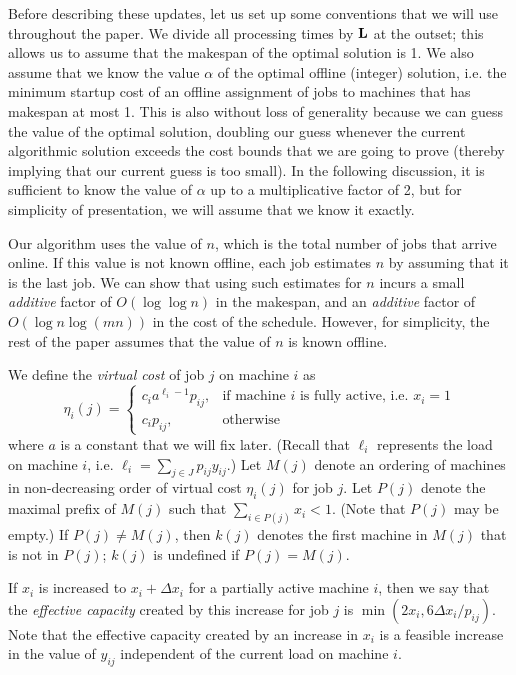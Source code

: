 \documentclass[11pt]{article}
\begin{document}
Before describing these updates, let us set up some 
conventions that we will use throughout the paper.
We divide all processing times by $\bf L$ at the outset;
this allows us to assume that the makespan of the optimal solution is 1.
We also assume that we know the value $\alpha$ of the optimal 
offline (integer) solution, i.e. the minimum startup cost of an offline 
assignment of jobs to machines that has makespan at most 1. 
This is also without loss of generality because we can guess the 
value of the optimal solution, doubling our guess whenever the 
current algorithmic solution exceeds the cost bounds that we are 
going to prove (thereby implying that our current guess is too small). 
In the following discussion, it is sufficient to
know the value of $\alpha$ up to a multiplicative 
factor of 2, but for simplicity
of presentation, we will assume that we know it exactly.

Our algorithm uses the value of $n$, which is the total number of
jobs that arrive online. If this value is not known offline, each job 
estimates $n$ by assuming that it is the last job. We can show that 
using such estimates for $n$ incurs a small {\em additive} factor of 
$O(\log \log n)$ in the makespan, and an {\em additive} factor of 
$O(\log n\log (mn))$ in the cost of the schedule. 
However, for simplicity, the rest of the paper assumes that the value 
of $n$ is known offline.

We define the {\em virtual cost} of job $j$ on machine $i$ as 
\begin{equation*}
\eta_i(j) = \left\{ \begin{array}{ll}
c_i a^{\ell_i-1} p_{ij}, & \text{if machine $i$ is fully active, i.e. } x_i = 1 \\
c_i p_{ij}, & \text{otherwise}
\end{array}\right.
\end{equation*}
where $a$ is a constant that we will fix later. 
(Recall that $\ell_i$ represents the load on machine $i$, 
i.e. $\ell_i = \sum_{j\in J} p_{ij} y_{ij}$.)
Let $M(j)$ denote
an ordering of machines in non-decreasing order of virtual cost 
$\eta_i(j)$ for job $j$. 
Let $P(j)$ denote the maximal prefix of $M(j)$ such that 
$\sum_{i\in P(j)} x_i < 1$. (Note that $P(j)$ may be empty.)  
If $P(j)\not= M(j)$, then $k(j)$ 
denotes the first machine in $M(j)$ that is not in $P(j)$; 
$k(j)$ is undefined if $P(j) = M(j)$.

If $x_i$ is increased to $x_i + \Delta x_i$ for a partially
active machine $i$, then
we say that the {\em effective capacity} created by this increase 
for job $j$ is $\min(2 x_i, 6 \Delta x_i/p_{ij})$.
Note that the effective capacity created by an increase in $x_i$ 
is a feasible increase in the value of $y_{ij}$ independent of the 
current load on machine $i$.
\end{document}
